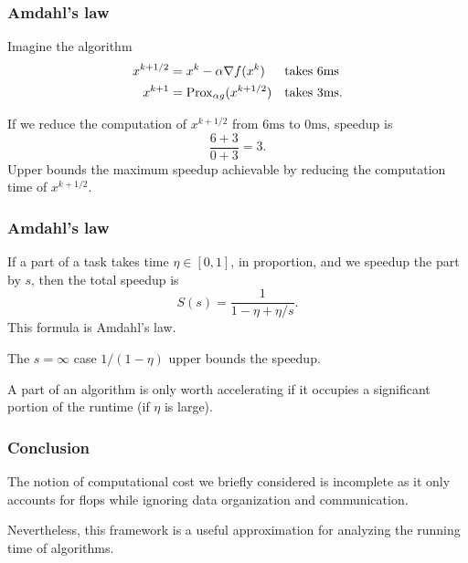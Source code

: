 \documentclass[10pt,mathserif]{beamer}
\begin{document}
\begin{frame}
\frametitle{Amdahl's law}
Imagine the algorithm
\begin{align*}
x^{k+1/2}&=x^k-\alpha\nabla f(x^k) &&\text{takes 6ms}\\
x^{k+1}&=\mathrm{Prox}_{\alpha g}(x^{k+1/2}) &&\text{takes 3ms}.
\end{align*}

If we reduce the computation of $x^{k+1/2}$ from $6\textrm{ms}$ to $0\mathrm{ms}$, speedup is
\[
\frac{6+3}{0+3}= 3.
\]
Upper bounds the maximum speedup achievable by reducing the computation time of $x^{k+1/2}$.

\end{frame}




\begin{frame}
\frametitle{Amdahl's law}
If a part of a task takes time $\eta\in[0,1]$, in proportion, and we speedup the part by $s$, then the total speedup is
\[
S(s)=\frac{1}{1-\eta+\eta/s}.
\]
This formula is Amdahl's law.

\vspace{0.2in}
The $s=\infty$ case $1/(1-\eta)$ upper bounds the speedup.

\vspace{0.2in}
A part of an algorithm is only worth accelerating if it occupies a significant portion of the runtime (if $\eta$ is large).
\end{frame}


\begin{frame}
\frametitle{Conclusion}

The notion of computational cost we briefly considered is incomplete as it only accounts for flops while ignoring data organization and communication.
\vspace{0.2in}


Nevertheless, this framework is a useful approximation for analyzing the running time of algorithms.
\end{frame}

\iffalse
\fi
\end{document}
